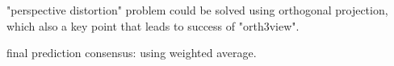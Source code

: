 "perspective distortion" problem could be solved using orthogonal projection, which also a key point that leads to success of "orth3view".

final prediction consensus: using weighted average.